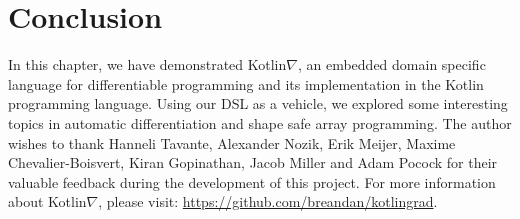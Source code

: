 \section{Conclusion}

In this chapter, we have demonstrated Kotlin$\nabla$, an embedded domain specific language for differentiable programming and its implementation in the Kotlin programming language. Using our DSL as a vehicle, we explored some interesting topics in automatic differentiation and shape safe array programming. The author wishes to thank Hanneli Tavante, Alexander Nozik, Erik Meijer, Maxime Chevalier-Boisvert, Kiran Gopinathan, Jacob Miller and Adam Pocock for their valuable feedback during the development of this project. For more information about Kotlin$\nabla$, please visit: \url{https://github.com/breandan/kotlingrad}.